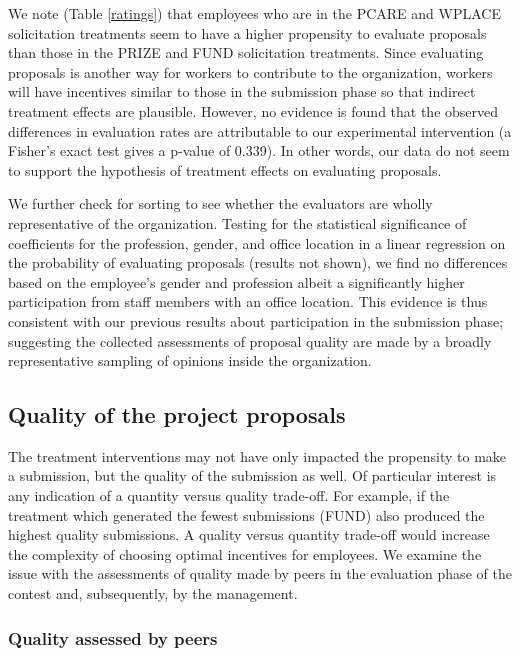 \documentclass[11pt]{article}
\begin{document}


We note (Table \ref{ratings}) that employees who are in the PCARE and
WPLACE solicitation treatments seem to have a higher propensity to
evaluate proposals than those in the PRIZE and FUND solicitation
treatments. Since evaluating proposals is another way for workers to
contribute to the organization, workers will have incentives similar to
those in the submission phase so that indirect treatment effects are
plausible. However, no evidence is found that the observed differences
in evaluation rates are attributable to our experimental intervention (a
Fisher's exact test gives a p-value of 0.339). In other words, our data
do not seem to support the hypothesis of treatment effects on evaluating
proposals.

We further check for sorting to see whether the evaluators are wholly
representative of the organization. Testing for the statistical
significance of coefficients for the profession, gender, and office
location in a linear regression on the probability of evaluating
proposals (results not shown), we find no differences based on the
employee's gender and profession albeit a significantly higher
participation from staff members with an office location. This evidence
is thus consistent with our previous results about participation in the
submission phase; suggesting the collected assessments of proposal
quality are made by a broadly representative sampling of opinions inside
the organization.

\subsection{Quality of the project
proposals}\label{quality-of-the-project-proposals}

The treatment interventions may not have only impacted the propensity to
make a submission, but the quality of the submission as well. Of
particular interest is any indication of a quantity versus quality
trade-off. For example, if the treatment which generated the fewest
submissions (FUND) also produced the highest quality submissions. A
quality versus quantity trade-off would increase the complexity of
choosing optimal incentives for employees. We examine the issue with the
assessments of quality made by peers in the evaluation phase of the
contest and, subsequently, by the management.

\subsubsection{Quality assessed by
peers}\label{quality-assessed-by-peers}
\end{document}
